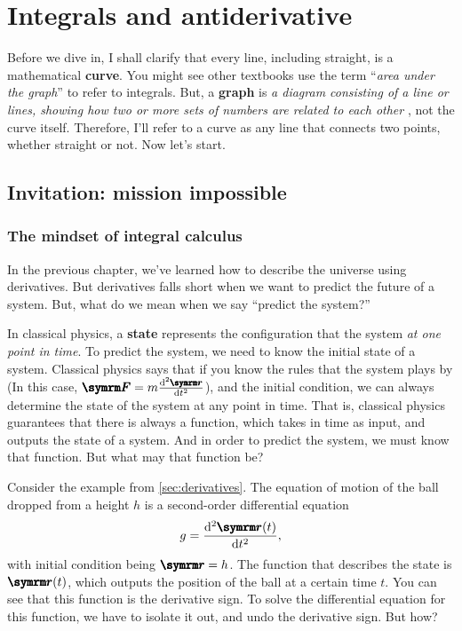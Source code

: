 \chapter{Integrals and antiderivative}
\label{sec:integrals}


Before we dive in, I shall clarify that every line, including straight, is a mathematical \textbf{curve}. You might see other textbooks use the term ``\textit{area under the graph}'' to refer to integrals. But, a \textbf{graph} is \textit{a diagram consisting of a line or lines, showing how two or more sets of numbers are related to each other} \cite{oxforddict}, not the curve itself. Therefore, I'll refer to a curve as any line that connects two points, whether straight or not. Now let's start.

\section{Invitation: mission impossible}

\subsection{The mindset of integral calculus}

In the previous chapter, we've learned how to describe the universe using derivatives. But derivatives falls short when we want to predict the future of a system. But, what do we mean when we say ``predict the system?''

In classical physics, a \textbf{state} represents the configuration that the system \emph{at one point in time}. To predict the system, we need to know the initial state of a system. Classical physics says that if you know the rules that the system plays by (In this case, $\vv{F} = m\dv[2]{\vv{r}}{t}$), and the initial condition, we can always determine the state of the system at any point in time. That is, classical physics guarantees that there is always a function, which takes in time as input, and outputs the state of a system. And in order to predict the system, we must know that function. But what may that function be?

Consider the example from \cref{sec:derivatives}. The equation of motion of the ball dropped from a height $h$ is a second-order differential equation
\begin{equation}
    g = \dv[2]{\vv{r}(t)}{t}, \label{eq:acceleration_from_gravity}
\end{equation}
with initial condition being $\vv{r} = h$. The function that describes the state is $\vv{r}(t)$, which outputs the position of the ball at a certain time $t$. You can see that this function is the derivative sign. To solve the differential equation for this function, we have to isolate it out, and undo the derivative sign. But how?

